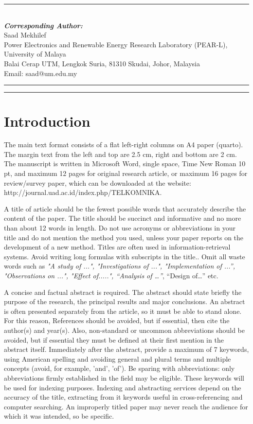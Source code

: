 \documentclass{telkomnika}
\begin{document}
\parbox[l]{\textwidth}{%
\rule{0.275\textwidth}{0.5pt} \hspace{0.5cm} \hrulefill
\\
\emph{\textbf{Corresponding Author:}}
\vspace{.5em}\\
Saad Mekhilef\\
Power Electronics and Renewable Energy Research Laboratory (PEAR-L), University of Malaya\\
Balai Cerap UTM, Lengkok Suria, 81310 Skudai, Johor, Malaysia\\
Email: saad@um.edu.my
}
\vspace{.5em}
\hrule
\vspace{.1em}
\hrule



\section{Introduction}
\label{}
The main text format consists of a flat left-right columns on A4 paper (quarto). The margin text from the left and top are 2.5 cm, right and bottom are 2 cm. The manuscript is written in Microsoft Word, single space, Time New Roman 10 pt, and maximum 12 pages for original research article, or maximum 16 pages for review/survey paper, which can be downloaded at the website: http://journal.uad.ac.id/index.php/TELKOMNIKA.

A title of article should be the fewest possible words that accurately describe the content of the paper. The title should be succinct and informative and no more than about 12 words in length. Do not use acronyms or abbreviations in your title and do not mention the method you used, unless your paper reports on the development of a new method. Titles are often used in information-retrieval systems. Avoid writing long formulas with  subscripts in the title.. Omit all waste words such as \textit{"A study of ...", "Investigations of ...", "Implementation of ...”, "Observations on ...", "Effect of.....", “Analysis of …”}, “Design of…” etc. 

A concise and factual abstract is required. The abstract should state briefly the purpose of the research, the principal results and major conclusions. An abstract is often presented separately from the article, so it must be able to stand alone. For this reason, References should be avoided, but if essential, then cite the author(s) and year(s). Also, non-standard or uncommon abbreviations should be avoided, but if essential they must be defined at their first mention in the abstract itself. Immediately after the abstract, provide a maximum of 7 keywords, using American spelling and avoiding general and plural terms and multiple concepts (avoid, for example, 'and', 'of'). Be sparing with abbreviations: only abbreviations firmly established in the field may be eligible. These keywords will be used for indexing purposes. Indexing and abstracting services depend on the accuracy of the title, extracting from it keywords useful in cross-referencing and computer searching. An improperly titled paper may never reach the audience for which it was intended, so be specific. 
\end{document}
